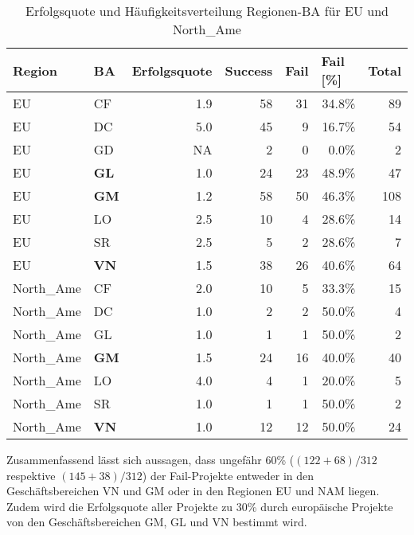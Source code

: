 \begin{table}[H]
	\centering
	\caption{Erfolgsquote und Häufigkeitsverteilung Regionen-BA für EU und North\_Ame}
	\begin{tabular}{llrrrrr}
		\textbf{Region} & \textbf{BA}    & \multicolumn{1}{l}{\textbf{Erfolgsquote}} & \multicolumn{1}{l}{\textbf{Success}} & \multicolumn{1}{l}{\textbf{Fail}} & \multicolumn{1}{l}{\textbf{Fail [\%]}} & \multicolumn{1}{l}{\textbf{Total}} \\\hline
		EU    & CF    & 1.9   & 58    & 31    & 34.8\% & 89 \\
		EU    & DC    & 5.0   & 45    & 9     & 16.7\% & 54 \\
		EU    & GD    & NA    & 2     & 0     & 0.0\% & 2 \\
		EU    & \textbf{GL}    & 1.0   & 24    & 23    & 48.9\% & 47 \\
		EU    & \textbf{GM}  & 1.2   & 58    & 50    & 46.3\% & 108 \\
		EU    & LO    & 2.5   & 10    & 4     & 28.6\% & 14 \\
		EU    & SR    & 2.5   & 5     & 2     & 28.6\% & 7 \\
		EU    & \textbf{VN}     & 1.5   & 38    & 26    & 40.6\% & 64 \\\hline
		North\_Ame & CF    & 2.0   & 10    & 5     & 33.3\% & 15 \\
		North\_Ame & DC    & 1.0   & 2     & 2     & 50.0\% & 4 \\
		North\_Ame & GL    & 1.0   & 1     & 1     & 50.0\% & 2 \\
		North\_Ame & \textbf{GM}   & 1.5   & 24    & 16    & 40.0\% & 40 \\
		North\_Ame & LO    & 4.0   & 4     & 1     & 20.0\% & 5 \\
		North\_Ame & SR    & 1.0   & 1     & 1     & 50.0\% & 2 \\
		North\_Ame & \textbf{VN}  & 1.0   & 12    & 12    & 50.0\% & 24 \\
	\end{tabular}%
	\label{tab:fregba}%
\end{table}%
Zusammenfassend lässt sich aussagen, dass ungefähr 60\% ($(122+68)/312$ respektive $(145+38)/312$) der Fail-Projekte entweder in den Geschäftsbereichen VN und GM oder in den Regionen EU und NAM liegen. Zudem wird die Erfolgsquote aller Projekte zu 30\% durch europäische Projekte von den Geschäftsbereichen GM, GL und VN bestimmt wird.
%
%
